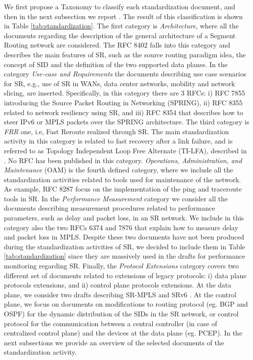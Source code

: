 We first propose a Taxonomy to classify each standardization document, and then in the next subsection we report  .
The result of this classification is shown in Table \ref{tab:standardization}. The first category is \textit{Architecture}, where all the documents regarding the description of the general architecture of a Segment Routing network are considered. The RFC 8402 falls into this category and describes the main features of SR, such as the source routing paradigm idea, the concept of SID and the definition of the two supported data planes.
In the category \textit{Use-case and Requirements} the documents describing use case scenarios for SR, e.g., use of SR in WANs, data center networks, mobility and network slicing, are inserted. Specifically, in this category there are 3 RFCs: i) RFC 7855 introducing the Source Packet Routing in Networking (SPRING), ii) RFC 8355 related to network resiliency using SR, and iii) RFC 8354 that describes how to steer IPv6 or MPLS packets over the SPRING architecture.
The third category is \textit{FRR} one, i.e, Fast Reroute realized through SR. The main standardization activity in this category is related to fast recovery after a link failure, and is referred to as Topology Independent Loop Free Alternate (TI-LFA), described in \cite{id-segment-routing-ti-lfa}. No RFC has been published in this category.
\textit{Operations, Administration, and Maintenance} (OAM) is the fourth defined category, where we include all the standardization activities related to tools used for maintenance of the network. As example, RFC 8287 focus on the implementation of the ping and traceroute tools in SR.
In the \textit{Performance Measurement} category we consider all the documents describing measurement procedures related to performance parameters, such as delay and packet loss, in an SR network. We include in this category also the two RFCs 6374 and 7876 that explain how to measure delay and packet loss in MPLS. Despite these two documents have not been produced during the standardization activities of SR, we decided to include them in Table \ref{tab:standardization} since they are massively used in the drafts for performance monitoring regarding SR.
Finally, the \textit{Protocol Extensions} category covers two different set of documents related to extensions of legacy protocols: i) data plane protocols extensions, and ii) control plane protocols extensions.
At the data plane, we consider two drafts describing SR-MPLS \cite{bryant-mpls-unified-ip-sr-03} and SRv6 \cite{draft-srh}.
At the control plane, we focus on documents on modifications to routing protocol (eg. BGP and OSPF) for the dynamic distribution of the SIDs in the SR network, or control protocol for the communication between a central controller (in case of centralized control plane) and the devices at the data plane (eg. PCEP).
In the next subsections we provide an overview of the selected documents of the standardization activity.

